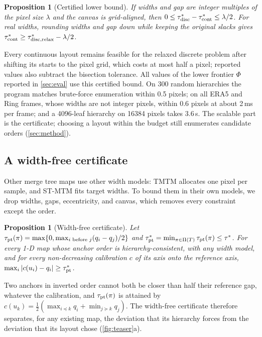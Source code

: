 \documentclass[review]{vgtc}                 %
\newtheorem{proposition}[theorem]{Proposition}
\begin{document}
\begin{proposition}[Certified lower bound]\label{prop:lb}
If widths and gap are integer multiples of the pixel size $\lambda$ and the canvas is grid-aligned, then $0\le\tau^*_{\rm disc}-\tau^*_{\rm cont}\le\lambda/2$. For real widths, rounding widths and gap \emph{down} while keeping the original slacks gives $\tau^*_{\rm cont}\ge\tau^*_{\rm disc,relax}-\lambda/2$.
\end{proposition}
Every continuous layout remains feasible for the relaxed discrete problem after shifting its starts to the pixel grid, which costs at most half a pixel; reported values also subtract the bisection tolerance. All values of the lower frontier $\Phi$ reported in \cref{sec:eval} use this certified bound. On 300 random hierarchies the program matches brute-force enumeration within 0.5 pixels; on all ERA5 and Ring frames, whose widths are not integer pixels, within 0.6 pixels at about 2\,ms per frame; and a 4096-leaf hierarchy on 16384 pixels takes 3.6\,s. The scalable part is the certificate; choosing a layout within the budget still enumerates candidate orders (\cref{sec:method}).

\subsection{A width-free certificate}
Other merge tree maps use other width models: TMTM allocates one pixel per sample, and ST-MTM fits target widths. To bound them in their own models, we drop widths, gaps, eccentricity, and canvas, which removes every constraint except the order.

\begin{proposition}[Width-free certificate]\label{prop:pt}
Let $\tau_{\rm pt}(\pi)=\max\{0,\max_{i\text{ before }j}(q_i-q_j)/2\}$ and $\tau^*_{\rm pt}=\min_{\pi\in\Pi(T)}\tau_{\rm pt}(\pi)\le\tau^*$. For every 1-D map whose anchor order is hierarchy-consistent, with any width model, and for every non-decreasing calibration $c$ of its axis onto the reference axis, $\max_i|c(u_i)-q_i|\ge\tau^*_{\rm pt}$.
\end{proposition}
Two anchors in inverted order cannot both be closer than half their reference gap, whatever the calibration, and $\tau_{\rm pt}(\pi)$ is attained by $c(u_k)=\frac12(\max_{i\preceq k}q_i+\min_{j\succeq k}q_j)$. The width-free certificate therefore separates, for any existing map, the deviation that its hierarchy forces from the deviation that its layout chose (\cref{fig:teaser}a).
\end{document}
